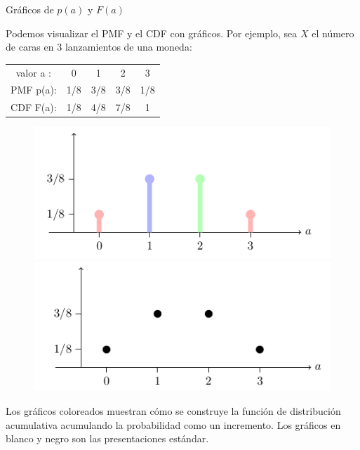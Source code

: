 \documentclass[10pt]{beamer}
\begin{document}
\begin{frame}{Gr\'aficos de $p(a)$ y $F(a)$}
\small{Podemos visualizar el PMF y el CDF con gr\'aficos. Por ejemplo, sea $X$ el n\'umero de caras en $3$ lanzamientos de una moneda:

\begin{table}[]
	\centering
	\begin{tabular}{ccccc}
		valor  a  :    & 0    & 1    & 2    & 3   \\
		PMF   p(a): & 1/8 & 3/8 &  3/8 &  1/8  \\
		CDF   F(a):& 1/8 & 4/8 &  7/8 &  1	
	\end{tabular}
\end{table}

\begin{figure}
	\centering
	\begin{minipage}{.5\textwidth}
		\centering
		\includegraphics[width=0.9\linewidth]{v2}
	\end{minipage}%
	\begin{minipage}{.5\textwidth}
		\centering
		\includegraphics[width=0.9\linewidth]{v3}
	\end{minipage}
\end{figure}
Los gr\'aficos coloreados muestran c\'omo se construye la funci\'on de distribuci\'on acumulativa acumulando la probabilidad como un incremento. Los gr\'aficos en blanco y negro son las presentaciones  est\'andar.
}
\end{frame}
\end{document}
